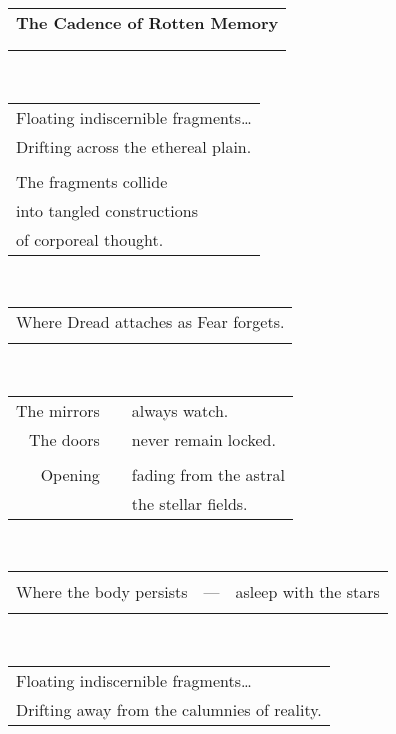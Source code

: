 \documentclass{article}
\begin{document}
\newcommand{\h}{\hspace*{2ex}}
\newcommand{\HHHH}{\hspace*{32ex}}

\begin{center}
\begin{tabular}{ll}
\multicolumn{2}{c}{\large\textbf{The Cadence of Rotten Memory}} \\
&\\\hline
&\\
\end{tabular} \\
\begin{tabular}{l}
Floating indiscernible fragments\ldots{} \\
Drifting across the ethereal plain. \\
\\
The fragments collide \\
into tangled constructions \\
of corporeal thought. \\
\end{tabular} \\
\begin{tabular}{l}
\\
Where Dread attaches as Fear forgets. \\
\\
\end{tabular} \\
\begin{tabular}{rcl}
The mirrors & \hspace*{4ex} & always watch. \\
The doors && never remain locked. \\
\\
Opening && fading from the astral \\
&& the stellar fields. \\
\end{tabular} \\
\begin{tabular}{lcl}
&&\\
Where the body persists & --- & asleep with the stars \\
&&\\
\end{tabular} \\
\begin{tabular}{l}
Floating indiscernible fragments\ldots{} \\
Drifting away from the calumnies of reality. \\

\end{tabular}
\end{center}
\end{document}
